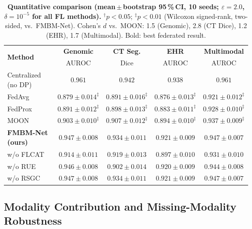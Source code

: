 \documentclass[a4paper,fleqn]{cas-dc}
\begin{document}
\begin{table}[!t]
\caption{\textbf{Quantitative comparison (mean\,$\pm$\,bootstrap 95\,\%\,CI,
10 seeds; $\varepsilon\!=\!2.0$, $\delta\!=\!10^{-5}$ for all FL methods).}
$^\dagger p\!<\!0.05$; $^\ddagger p\!<\!0.01$ (Wilcoxon signed-rank, two-sided,
vs.\ FMBM-Net). Cohen's $d$ vs.\ MOON: 1.5 (Genomic), 2.8 (CT Dice), 1.2
(EHR), 1.7 (Multimodal). Bold: best federated result.}
\label{tab:results}
\centering
\renewcommand{\arraystretch}{1.2}
\setlength{\tabcolsep}{5pt}
\begin{tabular}{lcccc}
\toprule
\multirow{2}{*}{\textbf{Method}} &
  \textbf{Genomic} & \textbf{CT Seg.} &
  \textbf{EHR} & \textbf{Multimodal}\\
& AUROC & Dice & AUROC & AUROC\\
\midrule
Centralized (no DP) & $0.961$ & $0.942$ & $0.938$ & $0.961$\\
\midrule
FedAvg \citep{mcmahan2017}
  & $0.879\!\pm\!0.014^\ddagger$
  & $0.891\!\pm\!0.016^\ddagger$
  & $0.876\!\pm\!0.013^\ddagger$
  & $0.921\!\pm\!0.012^\ddagger$\\
FedProx \citep{li2020fedprox}
  & $0.891\!\pm\!0.012^\ddagger$
  & $0.898\!\pm\!0.013^\ddagger$
  & $0.883\!\pm\!0.011^\ddagger$
  & $0.928\!\pm\!0.010^\ddagger$\\
MOON \citep{li2021moon}
  & $0.903\!\pm\!0.010^\ddagger$
  & $0.907\!\pm\!0.012^\ddagger$
  & $0.894\!\pm\!0.010^\ddagger$
  & $0.937\!\pm\!0.009^\ddagger$\\
\midrule
\textbf{FMBM-Net (ours)}
  & $\mathbf{0.947\!\pm\!0.008}$
  & $\mathbf{0.934\!\pm\!0.011}$
  & $\mathbf{0.921\!\pm\!0.009}$
  & $\mathbf{0.947\!\pm\!0.007}$\\
\quad w/o FLCAT
  & $0.914\!\pm\!0.011$
  & $0.919\!\pm\!0.013$
  & $0.897\!\pm\!0.010$
  & $0.931\!\pm\!0.010$\\
\quad w/o RUE
  & $0.946\!\pm\!0.008$
  & $0.902\!\pm\!0.014$
  & $0.920\!\pm\!0.009$
  & $0.944\!\pm\!0.008$\\
\quad w/o RSGC
  & $0.947\!\pm\!0.008$
  & $0.934\!\pm\!0.011$
  & $0.921\!\pm\!0.009$
  & $0.947\!\pm\!0.007$\\
\bottomrule
\end{tabular}
\end{table}

\subsection{Modality Contribution and Missing-Modality Robustness}
\label{subsec:missing}
\end{document}
